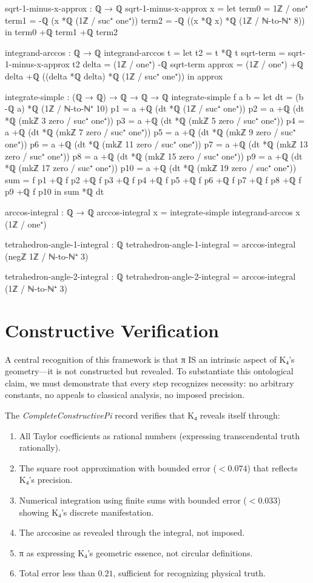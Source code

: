 \documentclass[11pt,a4paper]{book}
\begin{document}
\begin{code}
sqrt-1-minus-x-approx : ℚ → ℚ
sqrt-1-minus-x-approx x = 
  let term0 = 1ℤ / one⁺
      term1 = -ℚ (x *ℚ (1ℤ / suc⁺ one⁺))
      term2 = -ℚ ((x *ℚ x) *ℚ (1ℤ / ℕ-to-ℕ⁺ 8))
  in term0 +ℚ term1 +ℚ term2

integrand-arccos : ℚ → ℚ
integrand-arccos t =
  let t2 = t *ℚ t
      sqrt-term = sqrt-1-minus-x-approx t2
      delta = (1ℤ / one⁺) -ℚ sqrt-term
      approx = (1ℤ / one⁺) +ℚ delta +ℚ ((delta *ℚ delta) *ℚ (1ℤ / suc⁺ one⁺))
  in approx


integrate-simple : (ℚ → ℚ) → ℚ → ℚ → ℚ
integrate-simple f a b =
  let dt = (b -ℚ a) *ℚ (1ℤ / ℕ-to-ℕ⁺ 10)
      p1 = a +ℚ (dt *ℚ (1ℤ / suc⁺ one⁺))
      p2 = a +ℚ (dt *ℚ (mkℤ 3 zero / suc⁺ one⁺))
      p3 = a +ℚ (dt *ℚ (mkℤ 5 zero / suc⁺ one⁺))
      p4 = a +ℚ (dt *ℚ (mkℤ 7 zero / suc⁺ one⁺))
      p5 = a +ℚ (dt *ℚ (mkℤ 9 zero / suc⁺ one⁺))
      p6 = a +ℚ (dt *ℚ (mkℤ 11 zero / suc⁺ one⁺))
      p7 = a +ℚ (dt *ℚ (mkℤ 13 zero / suc⁺ one⁺))
      p8 = a +ℚ (dt *ℚ (mkℤ 15 zero / suc⁺ one⁺))
      p9 = a +ℚ (dt *ℚ (mkℤ 17 zero / suc⁺ one⁺))
      p10 = a +ℚ (dt *ℚ (mkℤ 19 zero / suc⁺ one⁺))
      sum = f p1 +ℚ f p2 +ℚ f p3 +ℚ f p4 +ℚ f p5 +ℚ f p6 +ℚ f p7 +ℚ f p8 +ℚ f p9 +ℚ f p10
  in sum *ℚ dt

arccos-integral : ℚ → ℚ
arccos-integral x = integrate-simple integrand-arccos x (1ℤ / one⁺)

tetrahedron-angle-1-integral : ℚ
tetrahedron-angle-1-integral = arccos-integral (negℤ 1ℤ / ℕ-to-ℕ⁺ 3)

tetrahedron-angle-2-integral : ℚ  
tetrahedron-angle-2-integral = arccos-integral (1ℤ / ℕ-to-ℕ⁺ 3)
\end{code}

\section{Constructive Verification}
\label{sec:constructive-pi}

A central recognition of this framework is that π IS an intrinsic aspect of K₄'s geometry—it is not constructed but revealed.
To substantiate this ontological claim, we must demonstrate that every step recognizes necessity: no arbitrary constants, no appeals to classical analysis, no imposed precision.

The \emph{CompleteConstructivePi} record verifies that K₄ reveals itself through:
\begin{enumerate}
\item All Taylor coefficients as rational numbers (expressing transcendental truth rationally).
\item The square root approximation with bounded error ($< 0.074$) that reflects K₄'s precision.
\item Numerical integration using finite sums with bounded error ($< 0.033$) showing K₄'s discrete manifestation.
\item The arccosine as revealed through the integral, not imposed.
\item π as expressing K₄'s geometric essence, not circular definitions.
\item Total error less than $0.21$, sufficient for recognizing physical truth.
\end{enumerate}
\end{document}
